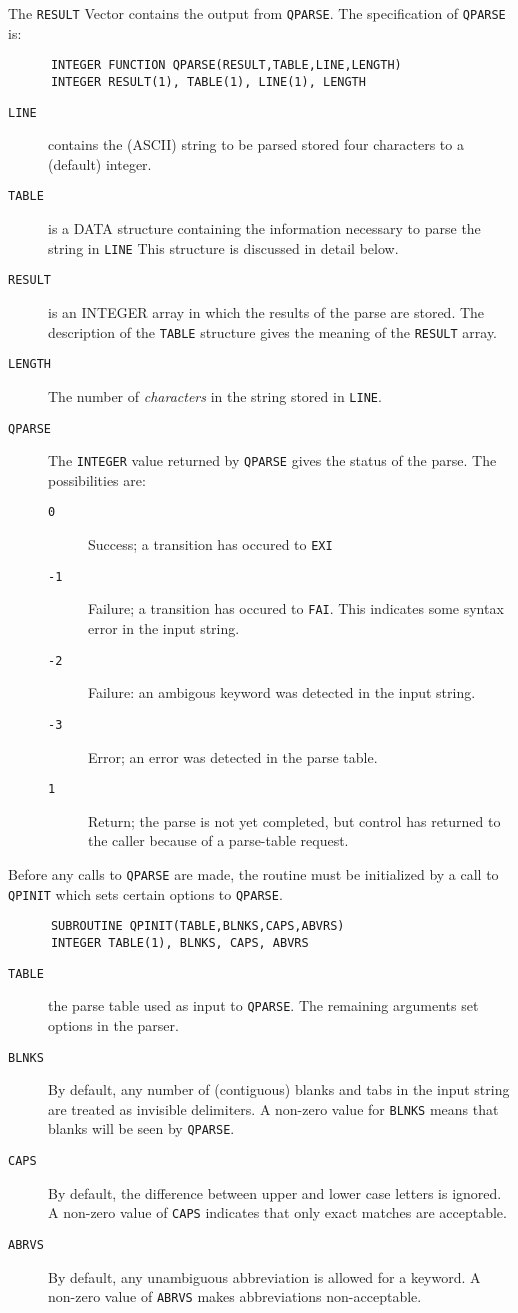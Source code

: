The {\tt RESULT} Vector contains the output from {\tt QPARSE}. 
The specification of {\tt QPARSE} is:
\begin{verbatim}
      INTEGER FUNCTION QPARSE(RESULT,TABLE,LINE,LENGTH)
      INTEGER RESULT(1), TABLE(1), LINE(1), LENGTH
\end{verbatim}
\begin{description}
\item[{\tt LINE}] contains the (ASCII) string to be parsed
stored four characters to a (default) integer.
\item[{\tt TABLE}] is a DATA structure containing the information necessary to
parse the string in {\tt LINE}
This structure is discussed in detail below.
\item[{\tt RESULT}] is an INTEGER array in which the results of the parse
are stored. The description of the {\tt TABLE} structure
gives the meaning of the {\tt RESULT} array.
\item[{\tt LENGTH}] The number of {\em characters} in the string stored
in {\tt LINE}.
\item[{\tt QPARSE}] The {\tt INTEGER} value returned by
{\tt QPARSE} gives the status of the
parse. The possibilities are:
\begin{description}
\item[{\tt 0}] Success; a transition has occured to {\tt EXI}
\item[{\tt -1}]  Failure; a transition has occured to {\tt FAI}. This
indicates some syntax error in the input string.
\item[{\tt -2}]    Failure: an ambigous keyword was detected in the
input string.
\item[{\tt -3}]  Error; an error was detected in the parse table.
\item[{\tt 1}]      Return; the parse is not yet completed, but
control has returned to the caller because of a
parse-table request.
\end{description}
\end{description}
Before any calls to {\tt QPARSE} are made,
the routine must be initialized by a call to
{\tt QPINIT} which sets certain options to {\tt QPARSE}.
\begin{verbatim}
      SUBROUTINE QPINIT(TABLE,BLNKS,CAPS,ABVRS)
      INTEGER TABLE(1), BLNKS, CAPS, ABVRS
\end{verbatim}
\begin{description}
\item[{\tt TABLE}] the parse table used as input to {\tt QPARSE}. The
remaining arguments set options in the parser. 
\item[{\tt BLNKS}]   By default, 
any number of (contiguous) blanks and tabs in the input string are treated
as invisible delimiters.
A non-zero value for {\tt BLNKS} means that
blanks will be seen by {\tt QPARSE}.
\item[{\tt CAPS}]     By default, the difference between upper and lower case
letters is ignored. A non-zero value of {\tt CAPS} indicates that
only exact matches are acceptable. 
\item[{\tt ABRVS}] By default, any unambiguous abbreviation is allowed for
a keyword. A non-zero value of {\tt ABRVS} makes abbreviations
non-acceptable.
\end{description}
